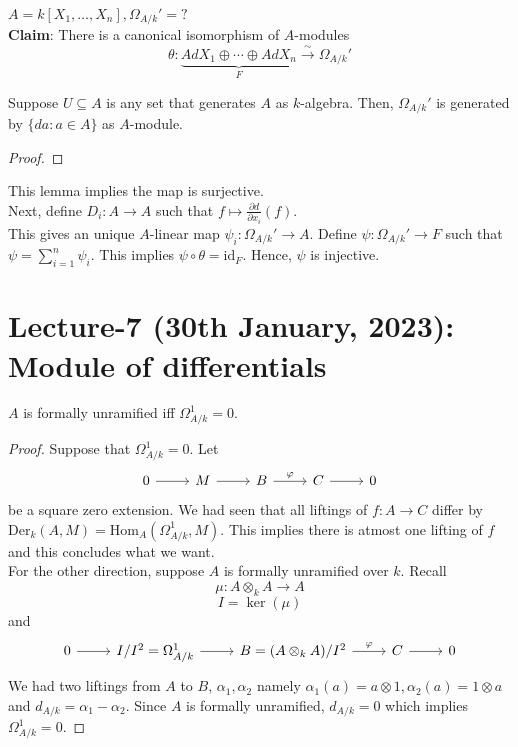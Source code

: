 \documentclass[oneside, 12pt]{scrbook}
\newcommand{\Hom}{\mathrm{Hom}}
\newcommand{\ds}{\displaystyle}
\theoremstyle{theorem}
\begin{document}
\begin{exercise}
$A= k[X_{1}, \hdots , X_{n}], \Omega_{A/k}' = ?$ \\
\textbf{Claim}: There is a canonical isomorphism of $A$-modules $$\theta : \underbrace{AdX_{1} \oplus \cdots \oplus AdX_{n}}_{F} \xrightarrow{\sim} \Omega_{A/k}'$$ 
\begin{lemma}
Suppose $U \subseteq A$ is any set that generates $A$ as $k$-algebra. Then, $\Omega_{A/k}'$ is generated by $\{da: a\in A\}$ as $A$-module. 
\end{lemma}
\begin{proof}

\end{proof}
This lemma implies the map is surjective. \\
Next, define $D_{i}: A \rightarrow A$ such that $f \mapsto \ds{\frac{\partial d}{\partial x_{i}}(f)}$. \\
This gives an unique $A$-linear map $\psi_{i}: \Omega_{A/k}' \rightarrow A$. Define $\psi: \Omega_{A/k}' \rightarrow F$ such that $\psi = \sum_{i=1}^n \psi_{i}$. This implies $\psi \circ \theta = \mathrm{id}_{F}$. Hence, $\psi$ is injective. 
\end{exercise}


\chapter{Lecture-7 (30th January, 2023): Module of differentials}

\begin{lemma}
$A$ is formally unramified iff $\Omega_{A/k}^{1} = 0$.
\end{lemma}

\begin{proof}
Suppose that $\Omega_{A/k}^{1} =0$. Let 
\[\begin{tikzcd}
	0 & M & B & C & 0
	\arrow[from=1-1, to=1-2]
	\arrow[from=1-2, to=1-3]
	\arrow["\varphi", from=1-3, to=1-4]
	\arrow[from=1-4, to=1-5]
\end{tikzcd}\] be a square zero extension. We had seen that all liftings of $f: A \rightarrow C$ differ by $\mathrm{Der}_{k}(A,M) = \Hom_{A}(\Omega_{A/k}^{1}, M)$. This implies there is atmost one lifting of $f$ and this concludes what we want. \\

For the other direction, suppose $A$ is formally unramified over $k$. Recall $$\mu: A \otimes_{k} A \rightarrow A$$ $$I = \ker(\mu)$$ and 
\[\begin{tikzcd}
	0 & I/I^2 = \Omega_{A/k}^{1} & B = (A \otimes_{k} A)/I^2 & C & 0
	\arrow[from=1-1, to=1-2]
	\arrow[from=1-2, to=1-3]
	\arrow["\varphi", from=1-3, to=1-4]
	\arrow[from=1-4, to=1-5]
\end{tikzcd}\]
We had two liftings from $A$ to $B$, $\alpha_{1},\alpha_{2}$ namely $\alpha_{1}(a) = a\otimes 1, \alpha_{2}(a) = 1 \otimes a$ and $d_{A/k} = \alpha_{1} - \alpha_{2}$. Since $A$ is formally unramified, $d_{A/k} = 0$ which implies $\Omega_{A/k}^{1} = 0$.
\end{proof}
\end{document}
